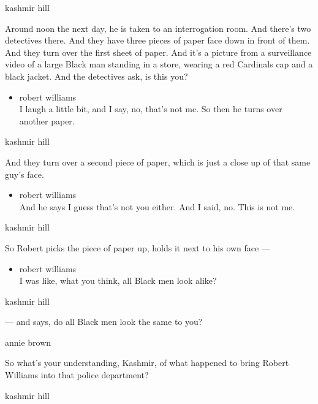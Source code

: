 kashmir hill

Around noon the next day, he is taken to an interrogation room. And
there's two detectives there. And they have three pieces of paper face
down in front of them. And they turn over the first sheet of paper. And
it's a picture from a surveillance video of a large Black man standing
in a store, wearing a red Cardinals cap and a black jacket. And the
detectives ask, is this you?

\begin{itemize}
\tightlist
\item
  robert williams\\
  I laugh a little bit, and I say, no, that's not me. So then he turns
  over another paper.
\end{itemize}

kashmir hill

And they turn over a second piece of paper, which is just a close up of
that same guy's face.

\begin{itemize}
\tightlist
\item
  robert williams\\
  And he says I guess that's not you either. And I said, no. This is not
  me.
\end{itemize}

kashmir hill

So Robert picks the piece of paper up, holds it next to his own face ---

\begin{itemize}
\tightlist
\item
  robert williams\\
  I was like, what you think, all Black men look alike?
\end{itemize}

kashmir hill

--- and says, do all Black men look the same to you?

annie brown

So what's your understanding, Kashmir, of what happened to bring Robert
Williams into that police department?

kashmir hill

